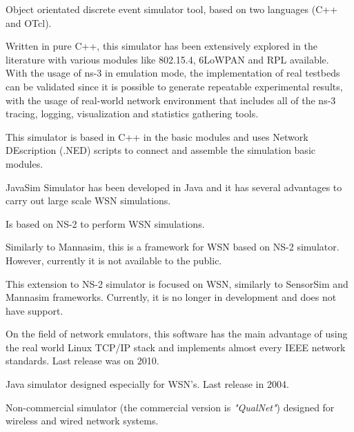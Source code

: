 \begin{description}
	\setlength\itemsep{0.5em}
	\item [NS-2 (network simulator-2)] 
	Object orientated discrete event simulator tool, based on two languages (C++ and OTcl). 
	
	\item [NS-3 (network simulator-3)] 
	Written in pure C++, this simulator has been extensively explored in the literature with various modules like 802.15.4, 6LoWPAN and RPL available. With the usage of ns-3 in emulation mode, the implementation of real testbeds can be validated since it is possible to generate repeatable experimental results, with the usage of real-world network environment that includes all of the ns-3 tracing, logging, visualization and statistics gathering tools.
	
	\item [OMNET++] 
	This simulator is based in C++ in the basic modules and uses Network DEscription (.NED) scripts to connect and assemble the simulation basic modules.

	\item [J-Sim] 
	JavaSim Simulator has been developed in Java and it has several advantages to carry out large scale WSN simulations.

	\item [Mannasim] 
	Is based on NS-2 to perform WSN simulations.

	\item [SensorSim] 
	Similarly to Mannasim, this is a framework for WSN based on NS-2 simulator. However, currently it is not available to the public. 

	\item [NRL Sensorsim] 
	This extension to NS-2 simulator is focused on WSN, similarly to SensorSim and Mannasim frameworks. Currently, it is no longer in development and does not have support.

	\item [NCTUns 6.0] 
	On the field of network emulators, this software has the main advantage of using the real world Linux TCP/IP stack and implements almost every IEEE network standards. Last release was on 2010.

	\item [SSFNet] 
	Java simulator designed especially for WSN's. Last release in 2004.

	\item [GloMoSim] 
	Non-commercial simulator (the commercial version is \textit{"QualNet"}) designed for wireless and wired network systems.


\end{description}
